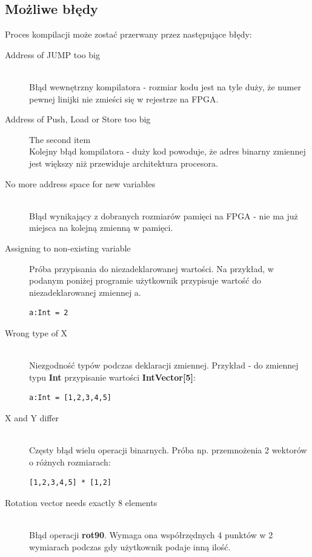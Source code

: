\subsection{Możliwe błędy}
Proces kompilacji może zostać przerwany przez następujące błędy:
\begin{description}
  \item[Address of JUMP too big]\hfill \\
       Błąd wewnętrzny kompilatora - rozmiar kodu jest na tyle duży, że numer pewnej linijki nie zmieści się w rejestrze na FPGA.
  \item[Address of Push, Load or Store too big] The second item\hfill \\
       Kolejny błąd kompilatora - duży kod powoduje, że adres binarny zmiennej jest większy niż przewiduje architektura procesora.
  \item[No more address space for new variables] \hfill \\
       Błąd wynikający z dobranych rozmiarów pamięci na FPGA - nie ma już miejsca na kolejną zmienną w pamięci.
  \item[Assigning to non-existing variable]
       Próba przypisania do niezadeklarowanej wartości. Na przykład, w podanym poniżej programie użytkownik przypisuje wartość do niezadeklarowanej zmiennej a.
\begin{lstlisting}[frame=single]
a:Int = 2
\end{lstlisting}
  \item[Wrong type of X]\hfill \\
      Niezgodność typów podczas deklaracji zmiennej. Przykład - do zmiennej typu \textbf{Int} przypisanie wartości       \textbf{IntVector[5]}:
\begin{lstlisting}[frame=single]
a:Int = [1,2,3,4,5]
\end{lstlisting}  
  \item[X and Y differ] \hfill \\
      Częsty błąd wielu operacji binarnych. Próba np. przemnożenia 2 wektorów o różnych rozmiarach:
\begin{lstlisting}[frame=single]
[1,2,3,4,5] * [1,2]
\end{lstlisting}       
  \item[Rotation vector needs exactly 8 elements] \hfill \\
      Błąd operacji \textbf{rot90}. Wymaga ona współrzędnych 4 punktów w 2 wymiarach podczas gdy użytkownik podaje inną ilość.
\begin{lstlisting}[frame=single]

\end{lstlisting}
\end{description}
